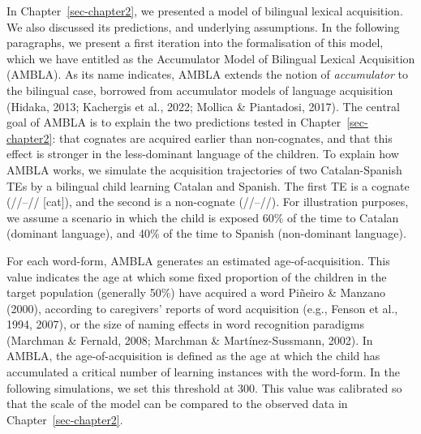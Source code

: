 \documentclass[
  12pt,
  b5paperpaper,
  twoside]{scrreprt}
\begin{document}
In Chapter~\ref{sec-chapter2}, we presented a model of bilingual lexical
acquisition. We also discussed its predictions, and underlying
assumptions. In the following paragraphs, we present a first iteration
into the formalisation of this model, which we have entitled as the
Accumulator Model of Bilingual Lexical Acquisition (AMBLA). As its name
indicates, AMBLA extends the notion of \emph{accumulator} to the
bilingual case, borrowed from accumulator models of language acquisition
(Hidaka, 2013; Kachergis et al., 2022; Mollica \& Piantadosi, 2017). The
central goal of AMBLA is to explain the two predictions tested in
Chapter~\ref{sec-chapter2}: that cognates are acquired earlier than
non-cognates, and that this effect is stronger in the less-dominant
language of the children. To explain how AMBLA works, we simulate the
acquisition trajectories of two Catalan-Spanish TEs by a bilingual child
learning Catalan and Spanish. The first TE is a cognate
(//--// {[}cat{]}), and the second is a
non-cognate (//--//). For illustration
purposes, we assume a scenario in which the child is exposed 60\% of the
time to Catalan (dominant language), and 40\% of the time to Spanish
(non-dominant language).

For each word-form, AMBLA generates an estimated age-of-acquisition.
This value indicates the age at which some fixed proportion of the
children in the target population (generally 50\%) have acquired a word
Piñeiro \& Manzano (2000), according to caregivers' reports of word
acquisition (e.g., Fenson et al., 1994, 2007), or the size of naming
effects in word recognition paradigms (Marchman \& Fernald, 2008;
Marchman \& Martínez-Sussmann, 2002). In AMBLA, the age-of-acquisition
is defined as the age at which the child has accumulated a critical
number of learning instances with the word-form. In the following
simulations, we set this threshold at 300. This value was calibrated so
that the scale of the model can be compared to the observed data in
Chapter~\ref{sec-chapter2}.
\end{document}
